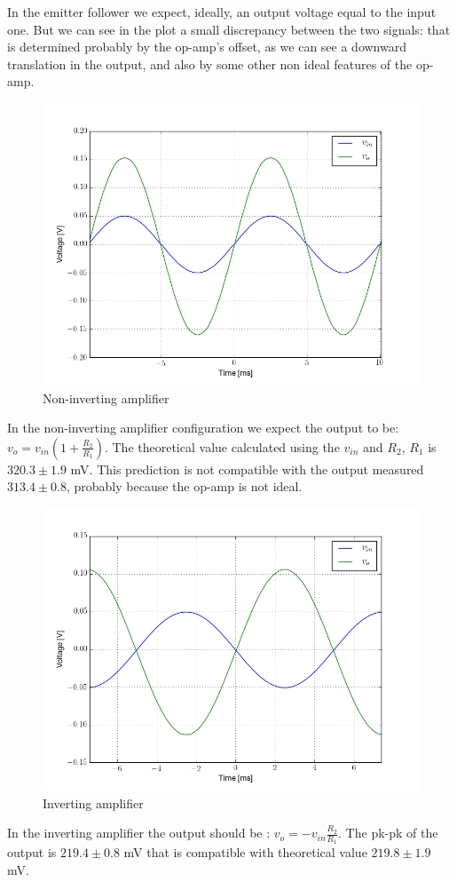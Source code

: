 \documentclass[oneside]{book}
\begin{document}
In the emitter follower we expect, ideally, an output voltage equal to the input one. But we can see in the plot a small discrepancy between the two signals: that is determined probably by the op-amp's offset, as we can see a downward translation in the output, and also by some other non ideal features of the op-amp.
\begin{figure}[H]
\centering
\includegraphics[width=.7\textwidth]{img/scope3.png}
\caption{Non-inverting amplifier}
\end{figure}
In the non-inverting amplifier configuration we expect the output to be: $v_o = v_{in} (1 + \frac{R_2}{R_1})$. The theoretical value calculated using the $v_{in}$ and $R_2$, $R_1$ is $320.3\pm 1.9$ mV. This prediction is not compatible with the output measured $313.4\pm 0.8$, probably because the op-amp is not ideal. 
\begin{figure}[H]
\centering
\includegraphics[width=.7\textwidth]{img/scope4.png}
\caption{Inverting amplifier}
\end{figure}
In the inverting amplifier the output should be : $v_o = - v_{in} \frac{R_2}{R_1}$. The pk-pk of the output is $219.4\pm 0.8$ mV that is compatible with theoretical value $219.8\pm 1.9$ mV.
\end{document}
